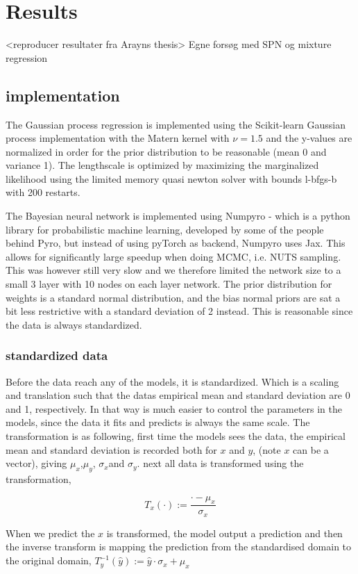 \chapter{Results}
<reproducer resultater fra Arayns thesis>
Egne forsøg med SPN og mixture regression


\section{implementation}
The Gaussian process regression is implemented using the Scikit-learn Gaussian process
implementation with the Matern kernel with $\nu=1.5$ and the y-values are normalized in order for
the prior distribution to be reasonable (mean 0 and variance 1). The lengthscale is optimized by
maximizing the marginalized likelihood using the limited memory quasi newton solver with bounds
l-bfgs-b with 200 restarts. 

The Bayesian neural network is implemented using Numpyro - which is a python library for
probabilistic machine learning, developed by some of the people behind Pyro, but instead of using
pyTorch as backend, Numpyro uses Jax. This allows for significantly large speedup when doing MCMC,
i.e. NUTS sampling. This was however still very slow and we therefore limited the network size to a
small 3 layer with 10 nodes on each layer network. The prior distribution for weights is a standard
normal distribution, and the bias normal priors are sat 
a bit less restrictive with a standard deviation of 2 instead. 
This is reasonable since the data is always standardized. 

\subsection{standardized data}
Before the data reach any of the models, it is standardized. Which is 
a scaling and translation such that the datas empirical mean and standard deviation are 0 and 1, respectively. 
In that way is much easier to control the parameters in the models, since the data it fits and predicts
is always the same scale. The transformation is as following, first time the models sees the data, 
the empirical mean and standard deviation is recorded both for $x$ and $y$, (note $x$ can be a vector),
giving $\mu_x$,$\mu_y$, $\sigma_x$and $\sigma_y$.
next all data is transformed using the transformation, 

$$T_x(\cdot) := \frac{\cdot-\mu_x}{\sigma_x}$$

When we predict the $x$ is transformed, the model output a prediction 
and then the inverse transform is mapping the prediction from the standardised
domain to the original domain, 
 $T^{-1}_y(\hat y) := \hat y \cdot \sigma_x+\mu_x$


